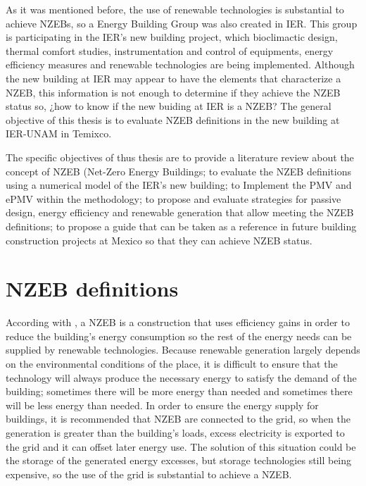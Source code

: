 As it was mentioned before, the use of renewable technologies is substantial to achieve NZEBs, so a Energy Building Group was also created in IER. This group is participating in the IER's new building project, which bioclimactic design, thermal comfort studies, instrumentation and control of equipments, energy efficiency measures and renewable technologies are being implemented. Although the new building at IER may appear to have the elements that characterize a NZEB, this information is not enough to determine if they achieve the NZEB status so, ¿how to know if the new buiding at IER is a NZEB? The general objective of this thesis is to evaluate NZEB definitions in the new building at IER-UNAM in Temixco.

The specific objectives of thus thesis are to provide a literature review about the concept of NZEB (Net-Zero Energy Buildings; to evaluate the NZEB definitions using a numerical model of the IER's new building; to Implement the PMV and ePMV within the methodology; to propose and evaluate strategies for passive design, energy efficiency and renewable generation that allow meeting the NZEB definitions; to propose a guide that can be taken as a reference in future building construction projects at Mexico  so that they can achieve NZEB status.



\section{NZEB definitions}
 
According with \citet{torcellini2006zero}, a NZEB is a construction that uses efficiency gains in order to reduce the building's energy consumption so the rest of the energy needs can be supplied by renewable technologies. Because renewable generation largely depends on the environmental conditions of the place, it is difficult to ensure that the technology will always produce the necessary energy to satisfy the demand of the building; sometimes there will be more energy than needed and sometimes there will be less energy than needed. In order to ensure the energy supply for buildings, it is recommended that NZEB are connected to the grid, so when the generation is greater than the building's loads, excess electricity is exported to the grid and it can offset later energy use. The solution of this situation could be the storage of the generated energy excesses, but storage technologies still being expensive, so the use of the grid is substantial to achieve a NZEB.

